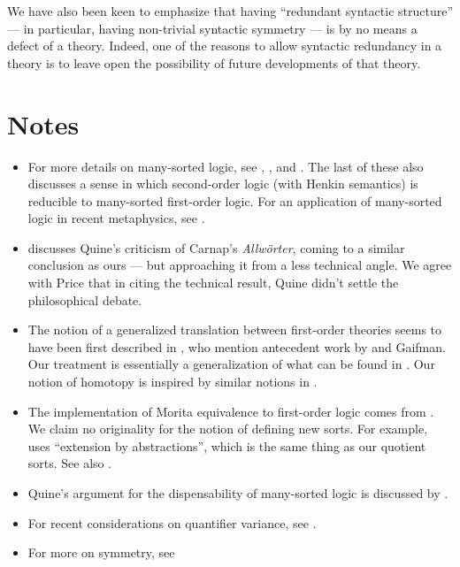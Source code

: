 We have also been keen to emphasize that having ``redundant syntactic
structure'' --- in particular, having non-trivial syntactic symmetry
--- is by no means a defect of a theory.  Indeed, one of the reasons
to allow syntactic redundancy in a theory is to leave open the
possibility of future developments of that theory.

\section{Notes}

\begin{itemize}
\item For more details on many-sorted logic, see \cite{feferman},
  \cite{manzano-paper}, and \cite{manzano-book}.  The last of these
  also discusses a sense in which second-order logic (with Henkin
  semantics) is reducible to many-sorted first-order logic.  For an
  application of many-sorted logic in recent metaphysics, see
  \cite{turners,turner}.
\item \cite{price2009} discusses Quine's criticism of Carnap's {\it
    Allw\"orter}, coming to a similar conclusion as ours --- but
  approaching it from a less technical angle.  We agree with Price
  that in citing the technical result, Quine didn't settle the
  philosophical debate.
\item The notion of a generalized translation between first-order
  theories seems to have been first described in \cite{van1984}, who
  mention antecedent work by \cite{szczerba1977} and Gaifman.  Our
  treatment is essentially a generalization of what can be found in
  \cite{snafu,strange,rood}.  Our notion of homotopy is inspired by
  similar notions in \cite{ahlbrandt}.
\item The implementation of Morita equivalence to first-order logic
  comes from \cite{barrett2015a}.  We claim no originality for the
  notion of defining new sorts.  For example, \cite{burgess1984} uses
  ``extension by abstractions'', which is the same thing as our
  quotient sorts.  See also \cite{mere1992,andreka2008}.
\item Quine's argument for the dispensability of many-sorted logic is
  discussed by \cite{barrett2015b}.
\item For recent considerations on quantifier variance, see
  \cite{warren2014,dorr,hirsch2017}.
\item For more on symmetry, see
  \cite{weather-hole,dewar2016a,barrett-beth} \end{itemize}





